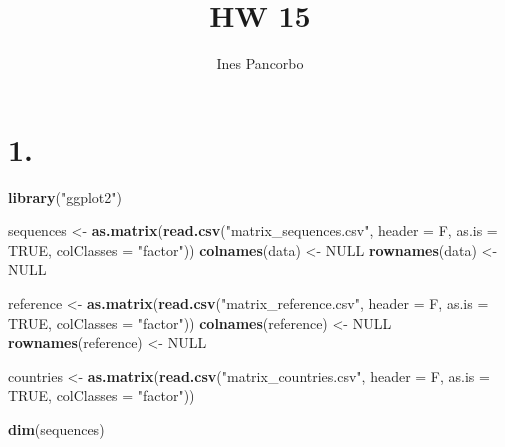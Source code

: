 \documentclass[]{article}
\title{HW 15}
\author{Ines Pancorbo}
\date{}
\newenvironment{Shaded}{\begin{snugshade}}{\end{snugshade}}
\newcommand{\DataTypeTok}[1]{\textcolor[rgb]{0.13,0.29,0.53}{#1}}
\newcommand{\KeywordTok}[1]{\textcolor[rgb]{0.13,0.29,0.53}{\textbf{#1}}}
\newcommand{\NormalTok}[1]{#1}
\newcommand{\OtherTok}[1]{\textcolor[rgb]{0.56,0.35,0.01}{#1}}
\newcommand{\StringTok}[1]{\textcolor[rgb]{0.31,0.60,0.02}{#1}}
\begin{document}
\maketitle

\hypertarget{section}{%
\section{1.}\label{section}}

\begin{Shaded}
\begin{Highlighting}[]
\KeywordTok{library}\NormalTok{(}\StringTok{"ggplot2"}\NormalTok{)}
\end{Highlighting}
\end{Shaded}

\begin{Shaded}
\begin{Highlighting}[]
\NormalTok{sequences <-}\StringTok{ }\KeywordTok{as.matrix}\NormalTok{(}\KeywordTok{read.csv}\NormalTok{(}\StringTok{"matrix_sequences.csv"}\NormalTok{, }\DataTypeTok{header =}\NormalTok{ F, }
                           \DataTypeTok{as.is =} \OtherTok{TRUE}\NormalTok{, }\DataTypeTok{colClasses =} \StringTok{"factor"}\NormalTok{))}
\KeywordTok{colnames}\NormalTok{(data) <-}\StringTok{ }\OtherTok{NULL}
\KeywordTok{rownames}\NormalTok{(data) <-}\StringTok{ }\OtherTok{NULL}

\NormalTok{reference <-}\StringTok{ }\KeywordTok{as.matrix}\NormalTok{(}\KeywordTok{read.csv}\NormalTok{(}\StringTok{"matrix_reference.csv"}\NormalTok{, }\DataTypeTok{header =}\NormalTok{ F, }
                                \DataTypeTok{as.is =} \OtherTok{TRUE}\NormalTok{, }\DataTypeTok{colClasses =} \StringTok{"factor"}\NormalTok{))}
\KeywordTok{colnames}\NormalTok{(reference) <-}\StringTok{ }\OtherTok{NULL}
\KeywordTok{rownames}\NormalTok{(reference) <-}\StringTok{ }\OtherTok{NULL}

\NormalTok{countries <-}\StringTok{ }\KeywordTok{as.matrix}\NormalTok{(}\KeywordTok{read.csv}\NormalTok{(}\StringTok{"matrix_countries.csv"}\NormalTok{, }\DataTypeTok{header =}\NormalTok{ F, }
                                \DataTypeTok{as.is =} \OtherTok{TRUE}\NormalTok{, }\DataTypeTok{colClasses =} \StringTok{"factor"}\NormalTok{))}
\end{Highlighting}
\end{Shaded}

\begin{Shaded}
\begin{Highlighting}[]
\KeywordTok{dim}\NormalTok{(sequences)}
\end{Highlighting}
\end{Shaded}
\end{document}
